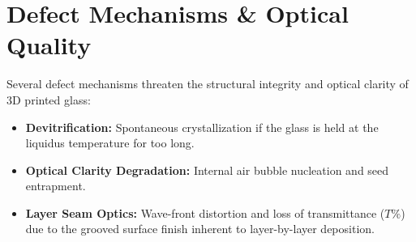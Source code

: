 \section{Defect Mechanisms \& Optical Quality}
Several defect mechanisms threaten the structural integrity and optical clarity of 3D printed glass:
\begin{itemize}
    \item \textbf{Devitrification:} Spontaneous crystallization if the glass is held at the liquidus temperature for too long.
    \item \textbf{Optical Clarity Degradation:} Internal air bubble nucleation and seed entrapment.
    \item \textbf{Layer Seam Optics:} Wave-front distortion and loss of transmittance ($T\%$) due to the grooved surface finish inherent to layer-by-layer deposition.
\end{itemize}

